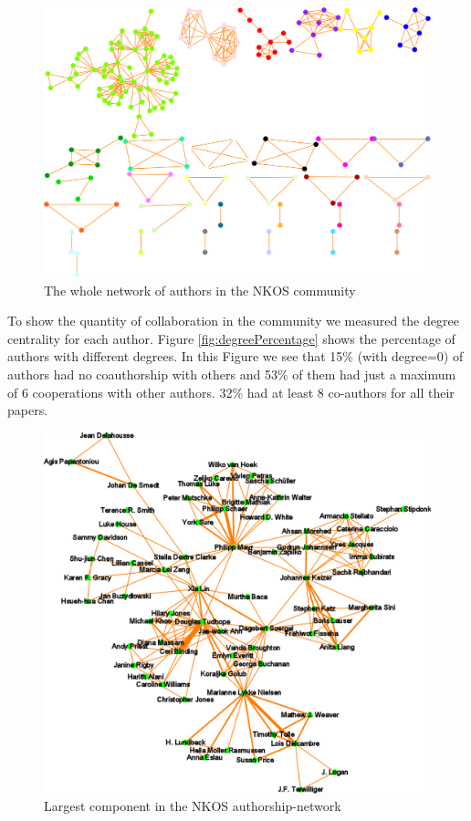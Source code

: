 \documentclass[runningheads,a4paper]{llncs}
\begin{document}
\begin{figure}[H]
	\centering
	\includegraphics[width=1.0\linewidth]{wholeNet}
	\caption{The whole network of authors in the NKOS community}
	\label{fig:wholenet}
\end{figure}

To show the quantity of collaboration in the community we measured the degree centrality for each author. Figure \ref{fig:degreePercentage} shows the percentage of authors with different degrees. In this Figure we see that 15\% (with degree=0) of authors had no coauthorship with others and 53\% of them had just a maximum of 6 cooperations with other authors. 32\% had at least 8 co-authors for all their papers.

\begin{figure}[H]
	\centering
	\includegraphics[width=0.7\linewidth]{largestComponent}
	\caption{Largest component in the NKOS authorship-network}
	\label{fig:largestComponent}
\end{figure}
\end{document}
